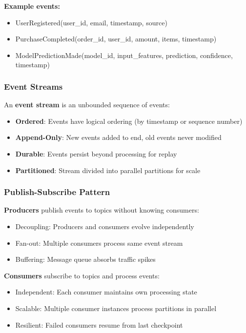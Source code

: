 \textbf{Example events:}
\begin{itemize}
    \item UserRegistered(user\_id, email, timestamp, source)
    \item PurchaseCompleted(order\_id, user\_id, amount, items, timestamp)
    \item ModelPredictionMade(model\_id, input\_features, prediction, confidence, timestamp)
\end{itemize}

\subsubsection{Event Streams}

An \textbf{event stream} is an unbounded sequence of events:
\begin{itemize}
    \item \textbf{Ordered}: Events have logical ordering (by timestamp or sequence number)
    \item \textbf{Append-Only}: New events added to end, old events never modified
    \item \textbf{Durable}: Events persist beyond processing for replay
    \item \textbf{Partitioned}: Stream divided into parallel partitions for scale
\end{itemize}

\subsubsection{Publish-Subscribe Pattern}

\textbf{Producers} publish events to topics without knowing consumers:
\begin{itemize}
    \item Decoupling: Producers and consumers evolve independently
    \item Fan-out: Multiple consumers process same event stream
    \item Buffering: Message queue absorbs traffic spikes
\end{itemize}

\textbf{Consumers} subscribe to topics and process events:
\begin{itemize}
    \item Independent: Each consumer maintains own processing state
    \item Scalable: Multiple consumer instances process partitions in parallel
    \item Resilient: Failed consumers resume from last checkpoint
\end{itemize}

